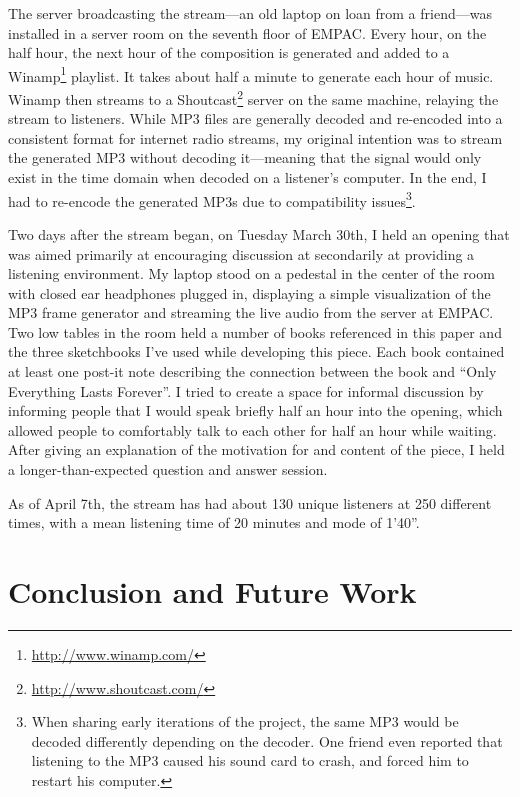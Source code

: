 \documentclass{thesis}
\begin{document}
The server broadcasting the stream---an old laptop on loan from a friend---was installed in a server room on the seventh floor of EMPAC. Every hour, on the half hour, the next hour of the composition is generated and added to a Winamp\footnote{\url{http://www.winamp.com/}} playlist. It takes about half a minute to generate each hour of music. Winamp then streams to a Shoutcast\footnote{\url{http://www.shoutcast.com/}} server on the same machine, relaying the stream to listeners. While MP3 files are generally decoded and re-encoded into a consistent format for internet radio streams, my original intention was to stream the generated MP3 without decoding it---meaning that the signal would only exist in the time domain when decoded on a listener's computer. In the end, I had to re-encode the generated MP3s due to compatibility issues\footnote{When sharing early iterations of the project, the same MP3 would be decoded differently depending on the decoder. One friend even reported that listening to the MP3 caused his sound card to crash, and forced him to restart his computer.}.

Two days after the stream began, on Tuesday March 30th, I held an opening that was aimed primarily at encouraging discussion at secondarily at providing a listening environment. My laptop stood on a pedestal in the center of the room with closed ear headphones plugged in, displaying a simple visualization of the MP3 frame generator and streaming the live audio from the server at EMPAC. Two low tables in the room held a number of books referenced in this paper and the three sketchbooks I've used while developing this piece. Each book contained at least one post-it note describing the connection between the book and ``Only Everything Lasts Forever''. I tried to create a space for informal discussion by informing people that I would speak briefly half an hour into the opening, which allowed people to comfortably talk to each other for half an hour while waiting. After giving an explanation of the motivation for and content of the piece, I held a longer-than-expected question and answer session.

As of April 7th, the stream has had about 130 unique listeners at 250 different times, with a mean listening time of 20 minutes and mode of 1'40''.

\chapter{Conclusion and Future Work}
\end{document}
